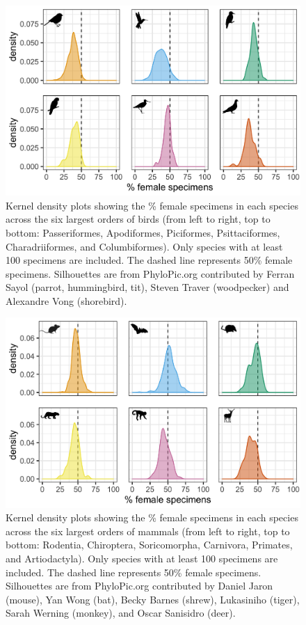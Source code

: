 \documentclass[a4paper, 12pt]{article}
\begin{document}
\newpage
\begin{figure}[h]
 \centering
  \includegraphics[width = \linewidth]{figures/orders-density-birds-six.png}
  \caption{Kernel density plots showing the \% female specimens in each species across the six largest orders of birds (from left to right, top to bottom: Passeriformes, Apodiformes, Piciformes, Psittaciformes, Charadriiformes, and Columbiformes). 
  Only species with at least 100 specimens are included. 
  The dashed line represents 50\% female specimens. 
  Silhouettes are from PhyloPic.org contributed by Ferran Sayol (parrot, hummingbird, tit), Steven Traver (woodpecker) and Alexandre Vong (shorebird).}
  \label{fig-bird_order_six}
\end{figure}


\newpage
\begin{figure}[h]
 \centering
  \includegraphics[width = \linewidth]{figures/orders-density-mammals-six.png}
  \caption{Kernel density plots showing the \% female specimens in each species across the six largest orders of mammals (from left to right, top to bottom: Rodentia, Chiroptera, Soricomorpha, Carnivora, Primates, and Artiodactyla). 
  Only species with at least 100 specimens are included. 
  The dashed line represents 50\% female specimens. 
  Silhouettes are from PhyloPic.org contributed by Daniel Jaron (mouse), Yan Wong (bat), Becky Barnes (shrew), Lukasiniho (tiger), Sarah Werning (monkey), and Oscar Sanisidro (deer).
}
  \label{fig-mammal_order_six}
\end{figure}
\end{document}
